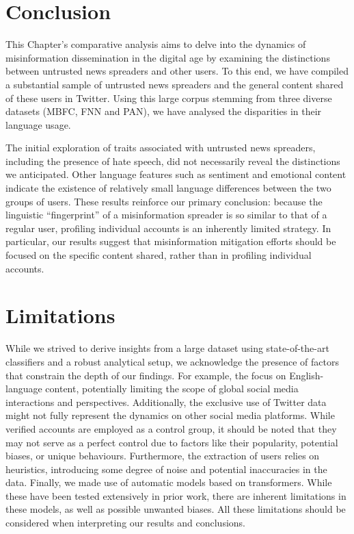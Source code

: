 \section{Conclusion}
This Chapter's comparative analysis aims to delve into the dynamics of misinformation dissemination in the digital age by examining the distinctions between untrusted news spreaders and other users. To this end, we have compiled a substantial sample of untrusted news spreaders and the general content shared of these users in Twitter. Using this large corpus stemming from three diverse datasets (MBFC, FNN and PAN), we have analysed the disparities in their language usage.

The initial exploration of traits associated with untrusted news spreaders, including the presence of hate speech, did not necessarily reveal the distinctions we anticipated. Other language features such as sentiment and emotional content indicate the existence of relatively small language differences between the two groups of users. These results reinforce our primary conclusion: because the linguistic ``fingerprint'' of a misinformation spreader is so similar to that of a regular user, profiling individual accounts is an inherently limited strategy. In particular, our results suggest that misinformation mitigation efforts should be focused on the specific content shared, rather than in profiling individual accounts.

\section{Limitations}
\label{sec:limitations}
While we strived to derive insights from a large dataset using state-of-the-art classifiers and a robust analytical setup, we acknowledge the presence of factors that constrain the depth of our findings. For example, the focus on English-language content, potentially limiting the scope of global social media interactions and perspectives. Additionally, the exclusive use of Twitter data might not fully represent the dynamics on other social media platforms. While verified accounts are employed as a control group, it should be noted that they may not serve as a perfect control due to factors like their popularity, potential biases, or unique behaviours. Furthermore, the extraction of users relies on heuristics, introducing some degree of noise and potential inaccuracies in the data. Finally, we made use of automatic models based on transformers. While these have been tested extensively in prior work, there are inherent limitations in these models, as well as possible unwanted biases. All these limitations should be considered when interpreting our results and conclusions.

